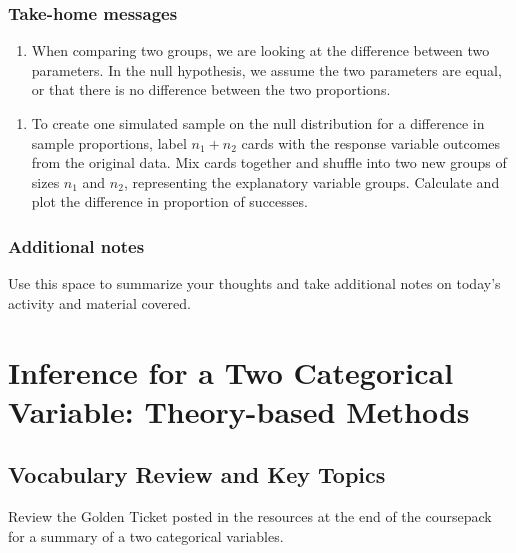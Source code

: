 \documentclass[
]{report}
\providecommand{\tightlist}{%
  \setlength{\itemsep}{0pt}\setlength{\parskip}{0pt}}
\begin{document}
\vspace{1in}

\subsection{Take-home messages}\label{take-home-messages-17}

\begin{enumerate}
\def\labelenumi{\arabic{enumi}.}
\tightlist
\item
  When comparing two groups, we are looking at the difference between two parameters. In the null hypothesis, we assume the two parameters are equal, or that there is no difference between the two proportions.
\end{enumerate}

\begin{enumerate}
\def\labelenumi{\arabic{enumi}.}
\setcounter{enumi}{1}
\tightlist
\item
  To create one simulated sample on the null distribution for a difference in sample proportions, label \(n_1 + n_2\) cards with the response variable outcomes from the original data. Mix cards together and shuffle into two new groups of sizes \(n_1\) and \(n_2\), representing the explanatory variable groups. Calculate and plot the difference in proportion of successes.
\end{enumerate}

\subsection{Additional notes}\label{additional-notes-17}

Use this space to summarize your thoughts and take additional notes on today's activity and material covered.

\newpage

\chapter{Inference for a Two Categorical Variable: Theory-based Methods}\label{inference-for-a-two-categorical-variable-theory-based-methods}

\section{Vocabulary Review and Key Topics}\label{vocabulary-review-and-key-topics-7}

Review the Golden Ticket posted in the resources at the end of the coursepack for a summary of a two categorical variables.
\end{document}
